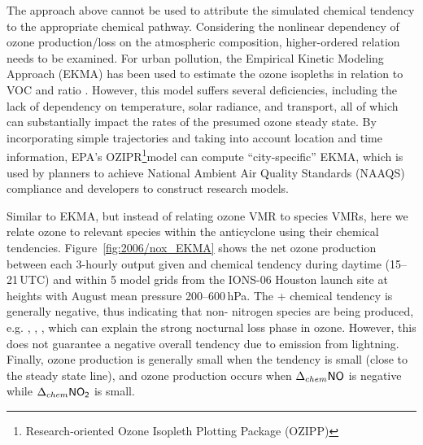 The approach above cannot be used to attribute the simulated chemical tendency to the appropriate chemical pathway. Considering the nonlinear
dependency of ozone
production/loss on the atmospheric composition, higher-ordered relation needs to be examined. For urban pollution, the Empirical Kinetic Modeling
Approach (EKMA) has been used to estimate the ozone isopleths in relation to VOC and  ratio \citep{Dimitriades:1977fk}. However, this model
suffers several deficiencies, including the lack of dependency on temperature, solar radiance, and transport, all of which can substantially impact the
rates of the presumed ozone steady state. By incorporating simple trajectories and taking into account location and time information, EPA's
OZIPR\footnote{Research-oriented Ozone Isopleth Plotting Package (OZIPP)}model can compute ``city-specific'' EKMA, which is used by
planners to achieve National Ambient Air Quality Standards (NAAQS) compliance and developers to construct research models.


Similar to EKMA, but instead of relating ozone VMR to species VMRs, here we relate ozone to relevant species within the anticyclone
using their chemical tendencies. Figure~\ref{fig:2006/nox_EKMA} shows the net ozone production between each 3-hourly output given
 and  chemical tendency during daytime (15--21\,\unit{UTC}) and within 5 model grids from the IONS-06 Houston
launch site at heights with August mean pressure 200--600\,\unit{hPa}. The + chemical tendency is generally
negative, thus indicating that non- nitrogen species are being produced, e.g. , , ,
which can explain the strong nocturnal loss phase in ozone. However, this does not guarantee a negative overall  tendency
due to  emission from lightning. Finally, ozone production is generally small when the  tendency is small (close to the
steady state line), and ozone production occurs when  $\Delta_{chem}\chem{NO}$ is negative while $\Delta_{chem}\chem{NO_2}$ is small.

